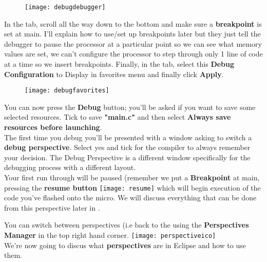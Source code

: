 {\newpage
\begin{figure}[htbp]
\centering
\texttt{[image: debugdebugger]}
\end{figure}
\par
In the \underline{} tab, scroll all the way down to the bottom and make sure a \textbf{\color{Purple} breakpoint} is set at main. I'll explain how to use/set up breakpoints later but they just tell the debugger to pause the processor at a particular point so we can see what memory values are set, we can't configure the processor to step through only 1 line of code at a time so we insert breakpoints. Finally, in the \underline{} tab, select this \textbf{Debug Configuration} to Display in favorites menu and finally click \textbf{\color{Purple} Apply}.
\begin{figure}[hbtp]
\centering
\texttt{[image: debugfavorites]}
\end{figure}
\par
You can now press the \textbf{\color{Purple} Debug} button; you'll be asked if you want to save some selected resources. Tick to save \textbf{"main.c"} and then select \textbf{\color{Purple} Always save resources before launching}.
\\
The first time you debug you'll be presented with a window asking to switch a \textbf{\color{Aquamarine} debug perspective}. Select yes and tick for the compiler to always remember your decision. The Debug Perspective is a different window specifically for the debugging process with a different layout.
\\ 
Your first run through will be paused (remember we put a \textbf{Breakpoint} at main, pressing the \textbf{\color{Purple}resume button} \texttt{[image: resume]} which will begin execution of the code you've flashed onto the micro. We will discuss everything that can be done from this perspective later in \cite{perspectives}.
\par
You can switch between perspectives (i.e back to the \underline{} using the \textbf{\color{Orange} Perspectives Manager} in the top right hand corner. \texttt{[image: perspectiveico]}\\
We're now going to discus what \textbf{\color{Aquamarine}perspectives} are in Eclipse and how to use them.
\newpage
}
